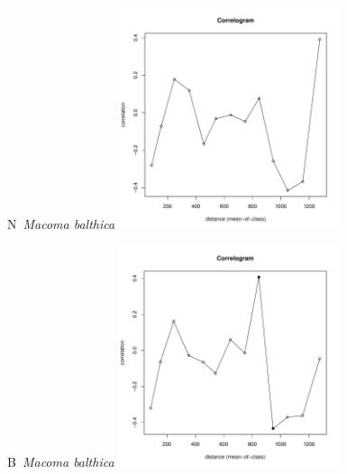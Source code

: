 \documentclass[12pt, a4paper]{disser}
\begin{document}
	\begin{figure}[h]

	\begin{minipage}[b]{.46\linewidth}
	\begin{center}
	{\small N~{\it Macoma balthica}}
		\includegraphics[width=65mm]{../Barenc_Sea/distribution_Moran/Plyazh082_moran_N_Macoma_balthica_.pdf}
	\end{center}
	\end{minipage}
%
	\hfil %
%
	\begin{minipage}[b]{.46\linewidth}
	\begin{center}
	{\small B~{\it Macoma balthica}}
		\includegraphics[width=65mm]{../Barenc_Sea/distribution_Moran/Plyazh082_moran_B_Macoma_balthica_.pdf}
	\end{center}
	\end{minipage}


\end{figure}
\end{document}
